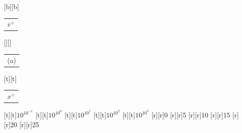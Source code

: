 %    
%
%
\begin{psfrags}%
\psfragscanon%
%
[b][b]{\color[rgb]{0.15,0.15,0.15}\setlength{\tabcolsep}{0pt}\begin{tabular}{c}$\overline{v}^+$\end{tabular}}%
[][]{\color[rgb]{0,0,0}\setlength{\tabcolsep}{0pt}\begin{tabular}{c}(a)\end{tabular}}%
[t][t]{\color[rgb]{0.15,0.15,0.15}\setlength{\tabcolsep}{0pt}\begin{tabular}{c}$x^+$\end{tabular}}%
%
\color[rgb]{0.15,0.15,0.15}%
%
[t][t]{$10^{10^{-1}}$}%
[t][t]{$10^{10^{0}}$}%
[t][t]{$10^{10^{1}}$}%
[t][t]{$10^{10^{2}}$}%
[t][t]{$10^{10^{3}}$}%
%
[r][r]{0}%
[r][r]{5}%
[r][r]{10}%
[r][r]{15}%
[r][r]{20}%
[r][r]{25}%
%
%
\end{psfrags}%
%
